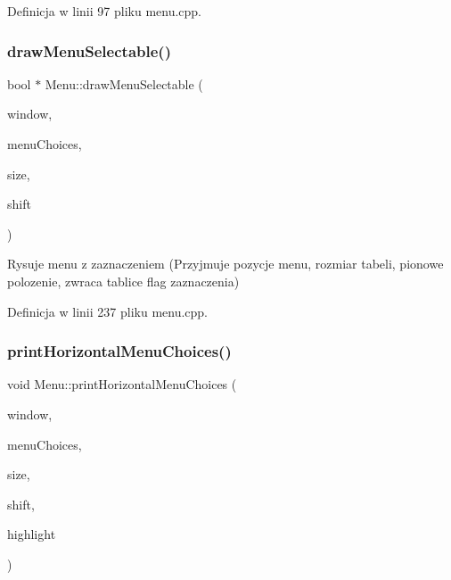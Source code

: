 Definicja w linii 97 pliku menu.\+cpp.

\mbox{\label{class_menu_adf2ca061cdf65bd87500c74c1f1c2584}} 
\subsubsection{\texorpdfstring{draw\+Menu\+Selectable()}{drawMenuSelectable()}}
{\footnotesize\ttfamily bool $\ast$ Menu\+::draw\+Menu\+Selectable (\begin{DoxyParamCaption}\item[{W\+I\+N\+D\+OW $\ast$}]{window,  }\item[{const std\+::string $\ast$}]{menu\+Choices,  }\item[{unsigned int}]{size,  }\item[{unsigned int}]{shift }\end{DoxyParamCaption})\hspace{0.3cm}{\ttfamily [static]}}

Rysuje menu z zaznaczeniem (Przyjmuje pozycje menu, rozmiar tabeli, pionowe polozenie, zwraca tablice flag zaznaczenia) 

Definicja w linii 237 pliku menu.\+cpp.

\mbox{\label{class_menu_aea098dfc2a133fae9e4b1c3c31bdc448}} 
\subsubsection{\texorpdfstring{print\+Horizontal\+Menu\+Choices()}{printHorizontalMenuChoices()}}
{\footnotesize\ttfamily void Menu\+::print\+Horizontal\+Menu\+Choices (\begin{DoxyParamCaption}\item[{W\+I\+N\+D\+OW $\ast$}]{window,  }\item[{const std\+::string $\ast$}]{menu\+Choices,  }\item[{unsigned int}]{size,  }\item[{unsigned int}]{shift,  }\item[{unsigned int}]{highlight }\end{DoxyParamCaption})\hspace{0.3cm}{\ttfamily [static]}}

